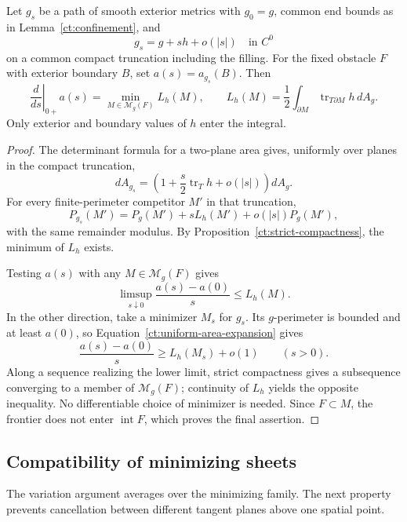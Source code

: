 \begin{proposition}
\label{ct:area-derivative}
Let $g_s$ be a path of smooth exterior metrics with $g_0=g$, common
end bounds as in Lemma~\ref{ct:confinement}, and
\[
 g_s=g+sh+o(|s|)\quad\text{in }C^0
\]
on a common compact truncation including the filling. For the fixed
obstacle $F$ with exterior boundary $B$, set $a(s)=a_{g_s}(B)$. Then
\begin{equation}
\label{ct:minimum-derivative}
 \left.\frac{d}{ds}\right|_{0+}a(s)
 =\min_{M\in\mathcal M_g(F)}L_h(M),\qquad
 L_h(M)=\frac12\int_{\partial M}
                  \operatorname{tr}_{T\partial M}h\,dA_g.
\end{equation}
Only exterior and boundary values of $h$ enter the integral.
\end{proposition}

\begin{proof}
The determinant formula for a two-plane area gives, uniformly over
planes in the compact truncation,
\[
 dA_{g_s}=\left(1+\frac s2\operatorname{tr}_T h+o(|s|)\right)dA_g.
\]
For every finite-perimeter competitor $M'$ in that truncation,
\begin{equation}
\label{ct:uniform-area-expansion}
 P_{g_s}(M')=P_g(M')+sL_h(M')+o(|s|)P_g(M'),
\end{equation}
with the same remainder modulus. By
Proposition~\ref{ct:strict-compactness}, the minimum of $L_h$ exists.

Testing $a(s)$ with any $M\in\mathcal M_g(F)$ gives
\[
 \limsup_{s\downarrow0}\frac{a(s)-a(0)}s\leq L_h(M).
\]
In the other direction, take a minimizer $M_s$ for $g_s$. Its
$g$-perimeter is bounded and at least $a(0)$, so
Equation~\ref{ct:uniform-area-expansion} gives
\[
 \frac{a(s)-a(0)}s\geq L_h(M_s)+o(1)\qquad(s>0).
\]
Along a sequence realizing the lower limit, strict compactness gives
a subsequence converging to a member of $\mathcal M_g(F)$; continuity
of $L_h$ yields the opposite inequality. No differentiable choice of
minimizer is needed. Since $F\subset M$, the frontier does not enter
$\operatorname{int}F$, which proves the final assertion.
\end{proof}

\subsection{Compatibility of minimizing sheets}
\label{ct:sheets-subsection}

The variation argument averages over the minimizing family. The next
property prevents cancellation between different tangent planes above
one spatial point.

